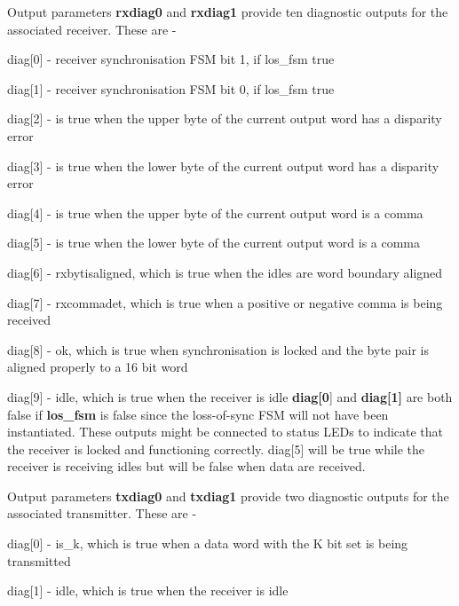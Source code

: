             Output parameters {\bf rxdiag0} and {\bf rxdiag1} provide ten
            diagnostic outputs for the associated receiver. These are -
            \blist
            \item   diag[0] - receiver synchronisation FSM bit 1, if los\_fsm true
            \item   diag[1] - receiver synchronisation FSM bit 0, if los\_fsm true
            \item   diag[2] - is true when the upper byte of the current output word
                    has a disparity error
            \item   diag[3] - is true when the lower byte of the current output word
                    has a disparity error
            \item   diag[4] - is true when the upper byte of the current output word
                    is a comma
            \item   diag[5] - is true when the lower byte of the current output word
                    is a comma
            \item   diag[6] - rxbytisaligned, which is true when the idles are
                    word boundary aligned
            \item   diag[7] - rxcommadet, which is true when a positive or negative comma
                    is being received
            \item   diag[8] - ok, which is true when synchronisation is locked and the
                    byte pair is aligned properly to a 16 bit word
            \item   diag[9] - idle, which is true when the receiver is idle
            \blend
            {\bf diag[0}] and {\bf diag[1]} are both false if {\bf los\_fsm} is
            false since the loss-of-sync FSM will not have been instantiated.
            These outputs might be connected to status LEDs to indicate that the
            receiver is locked and functioning correctly. diag[5] will be true
            while the receiver is receiving idles but will be false when data
            are received.

            Output parameters {\bf txdiag0} and {\bf txdiag1} provide two
            diagnostic outputs for the associated transmitter. These are -
            \blist
            \item   diag[0] - is\_k, which is true when a data word with the
                    K bit set is being transmitted
            \item   diag[1] - idle, which is true when the receiver is idle
            \blend




